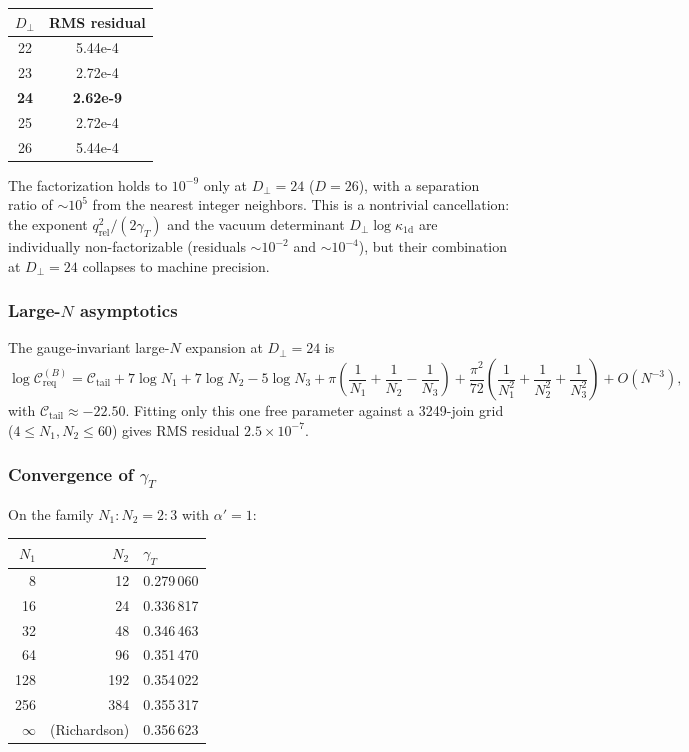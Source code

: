 \documentclass[11pt]{article}
\newcommand{\al}{\alpha'}
\newcommand{\perpD}{D_\perp}
\begin{document}
\medskip
\begin{center}
\begin{tabular}{c S[table-format=1.2e-1]}
\toprule
$\perpD$ & {RMS residual} \\
 & 5.44e-4 \\
23 & 2.72e-4 \\
\textbf{24} & \textbf{2.62e-9} \\
25 & 2.72e-4 \\
26 & 5.44e-4 \\
\bottomrule
\end{tabular}
\end{center}
\medskip

The factorization holds to $10^{-9}$ only at $\perpD = 24$ ($D = 26$), with a separation ratio of $\sim\!10^5$ from the nearest integer neighbors. This is a nontrivial cancellation: the exponent $q_{\mathrm{rel}}^2/(2\gamma_T)$ and the vacuum determinant $\perpD\log\kappa_{1\mathrm{d}}$ are individually non-factorizable (residuals $\sim\!10^{-2}$ and $\sim\!10^{-4}$), but their combination at $\perpD = 24$ collapses to machine precision.

\subsubsection{Large-$N$ asymptotics}

The gauge-invariant large-$N$ expansion at $\perpD = 24$ is
\begin{equation}
\log\mathcal{C}_{\mathrm{req}}^{(B)} = \mathcal{C}_{\mathrm{tail}} + 7\log N_1 + 7\log N_2 - 5\log N_3
+ \pi\!\left(\frac{1}{N_1} + \frac{1}{N_2} - \frac{1}{N_3}\right)
+ \frac{\pi^2}{72}\!\left(\frac{1}{N_1^2} + \frac{1}{N_2^2} + \frac{1}{N_3^2}\right) + O(N^{-3}),
\label{eq:asymptotic}
\end{equation}
with $\mathcal{C}_{\mathrm{tail}} \approx -22.50$. Fitting only this one free parameter against a 3249-join grid ($4 \le N_1, N_2 \le 60$) gives RMS residual $2.5 \times 10^{-7}$.

\subsubsection{Convergence of $\gamma_T$}

On the family $N_1:N_2 = 2:3$ with $\al = 1$:

\medskip
\begin{center}
\begin{tabular}{r r l}
\toprule
$N_1$ & $N_2$ & $\gamma_T$ \\
\midrule
8 & 12 & 0.279\,060 \\
16 & 24 & 0.336\,817 \\
32 & 48 & 0.346\,463 \\
64 & 96 & 0.351\,470 \\
128 & 192 & 0.354\,022 \\
256 & 384 & 0.355\,317 \\
\midrule
$\infty$ & (Richardson) & 0.356\,623 \\
\bottomrule
\end{tabular}
\end{center}
\end{document}
